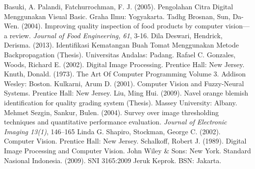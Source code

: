 \documentclass[laporan.tex]{subfiles}
\begin{document}
\begin{thebibliography}{99}
 Basuki, A. Palandi, Fatchurrochman, F. J. (2005). Pengolahan Citra Digital Menggunakan Visual Basic. Graha Ilmu: Yogyakarta.
 Tadhg Brosnan, Sun, Da-Wen. (2004). Improving quality inspection of food products by computer vision––a review. \emph{Journal of Food Engineering, 61}, 3-16.
 Dila Deswari, Hendrick, Derisma. (2013). Identifikasi Kematangan Buah Tomat Menggunakan Metode Backpropagation (Thesis). Universitas Andalas: Padang.
 Rafael C. Gonzales, Woods, Richard E. (2002). Digital Image Processing. Prentice Hall: New Jersey.
 Knuth, Donald. (1973). The Art Of Computer Programming Volume 3. Addison Wesley: Boston.
 Kulkarni, Arum D. (2001). Computer Vision and Fuzzy-Neural Systems. Prentice Hall: New Jersey.
 Liu, Ming Hui. (2009). Navel orange blemish identification for quality grading system (Thesis). Massey University: Albany.
 Mehmet Sezgin, Sankur, Bulen. (2004). Survey over image thresholding techniques and quantitative performance evaluation. \emph{Journal of Electronic Imaging 13(1)}, 146–165
  Linda G. Shapiro, Stockman, George C. (2002). Computer Vision. Prentice Hall: New Jersey. 
 Schalkoff, Robert J. (1989). Digital Image Processing and Computer Vision. John Wiley \& Sons: New York.
 Standard Nasional Indonesia. (2009). SNI 3165:2009 Jeruk Keprok. BSN: Jakarta.
\end{thebibliography}
\end{document}
